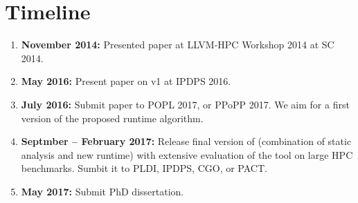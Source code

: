 \section{Timeline}
\label{sec:timeline}

\begin{enumerate}
\item \textbf{November 2014:} Presented paper at LLVM-HPC Workshop 2014 at SC
  2014.
\item \textbf{May 2016:} Present paper on \archer v1 at IPDPS 2016.
\item \textbf{July 2016:} Submit paper to POPL 2017, or PPoPP 2017.
  We aim for a first version of the proposed runtime algorithm.
\item \textbf{Septmber -- February 2017:} Release final version of \archer
  (combination of static analysis and new runtime) with extensive evaluation
  of the tool on large HPC benchmarks.
  Sumbit it to PLDI, IPDPS, CGO, or PACT.
\item \textbf{May 2017:} Submit PhD dissertation.
\end{enumerate}

